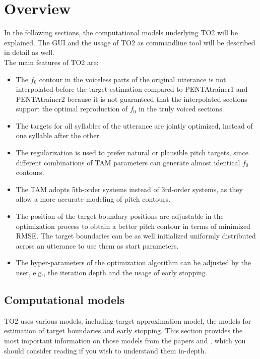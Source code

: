 \chapter{Overview}\label{chap:overview}
In the following sections, the computational models underlying TO2 will be explained. The GUI and the usage of TO2 as commandline tool will be described in detail as well.\\
The main features of TO2 are:
\begin{itemize}
\item The $f_{0}$ contour in the voiceless parts of the original utterance is not interpolated before the target estimation compared to PENTAtrainer1 \cite{TAM1} and PENTAtrainer2 \cite{TAM2} because it is not guaranteed that the interpolated sections support the optimal reproduction of $f_{0}$ in the truly voiced sections.
\item The targets for all syllables of the utterance are jointly optimized, instead of one syllable after the other.
\item The regularization is used to prefer natural or plausible pitch targets, since different combinations of TAM parameters can generate almost identical $f_{0}$ contours.
\item The TAM adopts 5th-order systems instead of 3rd-order systems, as they allow a more accurate modeling of pitch contours.
\item The position of the target boundary positions are adjustable in the optimization process to obtain a better pitch contour in terms of minimized RMSE. The target boundaries can be as well initialized uniformly distributed across an utterance to use them as start parameters.
\item The hyper-parameters of the optimization algorithm can be adjusted by the user, e.g., the iteration depth and the usage of early stopping.
\end{itemize}

\section{Computational models}
TO2 uses various models, including target approximation model, the models for estimation of target boundaries and early stopping. This section provides the most important information on those models from the papers \cite{TO1} and \cite{TO2}, which you should consider reading if you wish to understand them in-depth.

